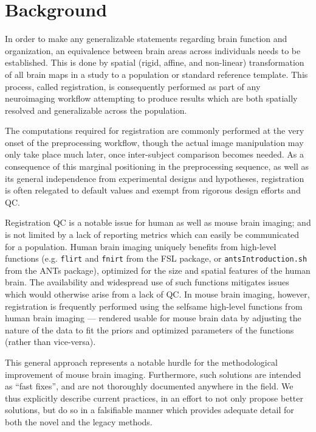 \section{Background}
\label{sec:bg}

In order to make any generalizable statements regarding brain function and organization, an equivalence between brain areas across individuals needs to be established.
This is done by spatial (rigid, affine, and non-linear) transformation of all brain maps in a study to a population or standard reference template.
This process, called registration, is consequently performed as part of any neuroimaging workflow attempting to produce results which are both spatially resolved and generalizable across the population.

The computations required for registration are commonly performed at the very onset of the preprocessing workflow,
though the actual image manipulation may only take place much later, once inter-subject comparison becomes needed.
As a consequence of this marginal positioning in the preprocessing sequence, as well as its general independence from experimental designs and hypotheses, registration is often relegated to default values and exempt from rigorous design efforts and QC.

Registration QC is a notable issue for human as well as mouse brain imaging;
and is not limited by a lack of reporting metrics which can easily be communicated for a population.
Human brain imaging uniquely benefits from high-level functions (e.g. \textcolor{mg}{\texttt{flirt}} and  \textcolor{mg}{\texttt{fnirt}} from the FSL package\cite{fsl}, or \textcolor{mg}{\texttt{antsIntroduction.sh}} from the ANTs package\cite{ants}), optimized for the size and spatial features of the human brain.
The availability and widespread use of such functions mitigates issues which would otherwise arise from a lack of QC.
In mouse brain imaging, however, registration is frequently performed using the selfsame high-level functions from human brain imaging --- rendered usable for mouse brain data by adjusting the nature of the data to fit the priors and optimized parameters of the functions (rather than vice-versa).

This general approach represents a notable hurdle for the methodological improvement of mouse brain imaging.
Furthermore, such solutions are intended as “fast fixes”, and are not thoroughly documented anywhere in the field.
We thus explicitly describe current practices, in an effort to not only propose better solutions, but do so in a falsifiable manner which provides adequate detail for both the novel and the legacy methods.

